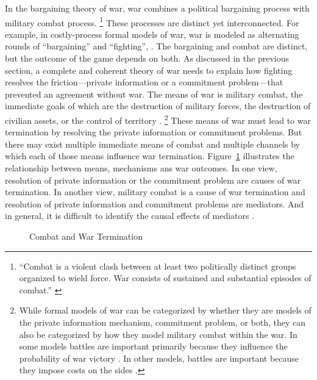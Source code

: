 In the bargaining theory of war, war combines a political bargaining process with military combat process.%
\footnote{%
  ``Combat is a violent clash between at least two politically distinct groups organized to wield force. War consists of sustained and substantial episodes of combat.'' \parencite{Reiter2003} %
} %
These processes are distinct yet interconnected. 
For example, in costly-process formal models of war, war is modeled as alternating rounds of ``bargaining'' and ``fighting'', \eg{}\textcite{Slantchev2003}.
The bargaining and combat are distinct, but the outcome of the game depends on both.
As discussed in the previous section, a complete and coherent theory of war needs to explain how fighting resolves the friction---private information or a commitment problem---that prevented an agreement without war.
The means of war is military combat, the immediate goals of which are the destruction of military forces, the destruction of civilian assets, or the control of territory \parencite[30]{Reiter2003}.%
\footnote{
While formal models of war can be categorized by whether they are models of the private information mechanism, commitment problem, or both, they can also be categorized by how they model military combat within the war.
In some models battles are important primarily because they influence the probability of war victory \parencites{Powell2004}{Wagner2000}{LeventogluSlantchev2007}{Slantchev2003}{SmithStam2004}.
In other models, battles are important because they impose costs on the sides \parencites{FilsonWerner2002}{Powell2004}{LeventogluSlantchev2007}. %
}
These means of war must lead to war termination by resolving the private information or commitment problems.
But there may exist multiple immediate means of combat and multiple channels by which each of those means influence war termination.
Figure~\ref{bonds:fig:combat-causal-diagram} illustrates the relationship between means, mechanisms ans war outcomes.
In one view, resolution of private information or the commitment problem are causes of war termination.
In another view, military combat is a cause of war termination and resolution of private information and commitment problems are mediators.
And in general, it is difficult to identify the causal effects of mediators \parencite{Keele2015a}.

\begin{figure}[!htpb]
  \centering
  
  \caption{Combat and War Termination}
  \label{bonds:fig:combat-causal-diagram}
\end{figure}


